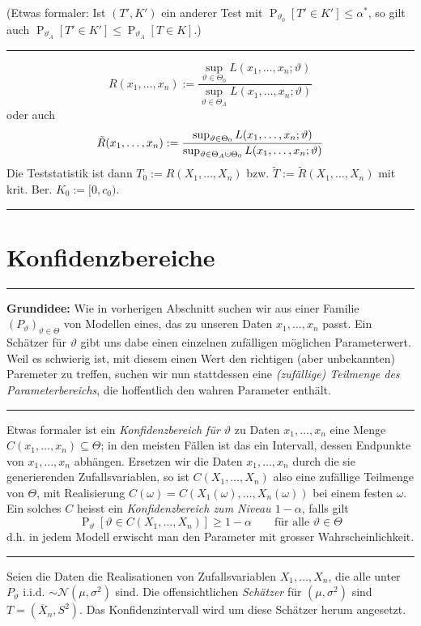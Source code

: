 \documentclass[a4paper, 12pt]{extarticle}
\newcommand{\sep}{\vspace{5pt}\noindent\hrule\vspace{5pt}}
\newcommand{\cN}{\mathcal{N}}
\newcommand{\cupdot}{\mathbin{\mathaccent\cdot\cup}}
\newcommand{\Prob}[2][]{\operatorname{P}_{#1}\left[ #2 \right]}
\begin{document}
\begin{multicols*}{2}
(Etwas formaler: Ist $(T',K')$ ein anderer Test mit $\Prob[\vartheta_0]{T'\in
K'}\leq \alpha^*$, so gilt auch $\Prob[\vartheta_A]{T'\in K'}\leq
\Prob[\vartheta_A]{T\in K}$.)

\sep

\[
R(x_1,\ldots,x_n):=\frac{
\sup_{\vartheta \in\Theta_0}L(x_1,\ldots,x_n;\vartheta)
}{
\sup_{\vartheta \in\Theta_A}L(x_1,\ldots,x_n;\vartheta)
}
\]
oder auch
\[
\tilde{R}(x_1,\ldots,x_n):=\frac{
\sup_{\vartheta \in\Theta_0}L(x_1,\ldots,x_n;\vartheta)
}{
\sup_{\vartheta \in\Theta_A\cupdot\Theta_0}L(x_1,\ldots,x_n;\vartheta)
}
\]
Die Teststatistik ist dann $T_0:=R(X_1,\ldots,X_n)$ bzw.
$\tilde{T}:=\tilde{R}(X_1,\ldots,X_n)$ mit krit. Ber. $K_0:=[0,c_0)$.

\sep

\section{Konfidenzbereiche}

\sep

\textbf{Grundidee:} Wie in vorherigen Abschnitt suchen wir aus einer Familie
$(P_\vartheta)_{\vartheta\in\Theta}$ von Modellen eines, das zu unseren Daten
$x_1,\ldots,x_n$ passt. Ein Schätzer für $\vartheta$ gibt uns dabe einen
einzelnen zufälligen möglichen Parameterwert. Weil es schwierig ist, mit diesem
einen Wert den richtigen (aber unbekannten) Paremeter zu treffen, suchen wir nun
stattdessen eine \emph{(zufällige) Teilmenge des Parameterbereichs}, die
hoffentlich den wahren Parameter enthält.

\sep

\Def[Konfidenzbereich] Etwas formaler ist ein \emph{Konfidenzbereich für
$\vartheta$} zu Daten $x_1,\ldots,x_n$ eine Menge
$C(x_1,\ldots,x_n)\subseteq\Theta$; in den meisten Fällen ist das ein Intervall,
dessen Endpunkte von $x_1,\ldots,x_n$ abhängen. Ersetzen wir die Daten
$x_1,\ldots,x_n$ durch die sie generierenden Zufallsvariablen, so ist
$C(X_1,\ldots,X_n)$ also eine zufällige Teilmenge von $\Theta$, mit Realisierung
$C(\omega)=C(X_1(\omega),\ldots,X_n(\omega))$ bei einem festen $\omega$. Ein
solches $C$ heisst ein \emph{Konfidenzbereich zum Niveau $1-\alpha$}, falls gilt
\[
\Prob[\vartheta]{\vartheta\in C(X_1,\ldots,X_n)}\geq 1-\alpha
\qquad
\text{für alle }\vartheta\in\Theta
\]
d.h. in jedem Modell erwischt man den Parameter mit grosser Wahrscheinlichkeit.

\sep

Seien die Daten die Realisationen von Zufallsvariablen $X_1,\ldots,X_n$, die
alle unter $P_\vartheta$ i.i.d. $\sim\cN(\mu,\sigma^2)$ sind. Die
offensichtlichen \emph{Schätzer} für $(\mu,\sigma^2)$ sind
$T=(\overline{X}_n,S^2)$. Das Konfidenzintervall wird um diese Schätzer herum
angesetzt.


\end{multicols*}
\end{document}
